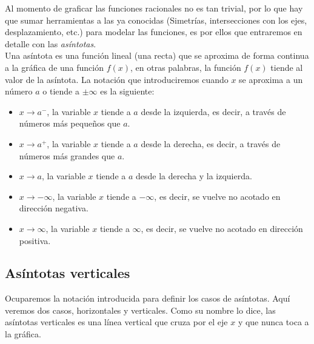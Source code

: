 Al momento de graficar las funciones racionales no es tan trivial, por lo que hay que sumar herramientas a las ya conocidas (Simetrías, intersecciones con los ejes, desplazamiento, etc.) para modelar las funciones, es por ellos que entraremos en detalle con las \textit{asíntotas}.\\

Una asíntota es una función lineal (una recta) que se aproxima de forma continua a la gráfica de una función $f(x)$, en otras palabras, la función $f(x)$ tiende al valor de la asíntota. La notación que introduciremos cuando $x$ se aproxima a un número $a$ o tiende a $\pm\infty$ es la siguiente:
\begin{itemize}
	\item $x\rightarrow a^{-}$, la variable $x$ tiende a $a$ desde la izquierda, es decir, a través de números más pequeños que $a$.\\
	\item $x\rightarrow a^{+}$, la variable $x$ tiende a $a$ desde la derecha, es decir, a través de números más grandes que $a$.\\
	\item $x\rightarrow a$, la variable $x$ tiende a $a$ desde la derecha y la izquierda.\\
	\item $x\rightarrow -\infty$, la variable $x$ tiende a $-\infty$, es decir, se vuelve no acotado en dirección negativa.\\
	\item $x\rightarrow \infty$, la variable $x$ tiende a $\infty$, es decir, se vuelve no acotado en dirección positiva.\\
\end{itemize}

\subsection{Asíntotas verticales}
Ocuparemos la notación introducida para definir los casos de asíntotas. Aquí veremos dos casos, horizontales y verticales. Como su nombre lo dice, las asíntotas verticales es una línea vertical que cruza por el eje $x$ y que nunca toca a la gráfica.

